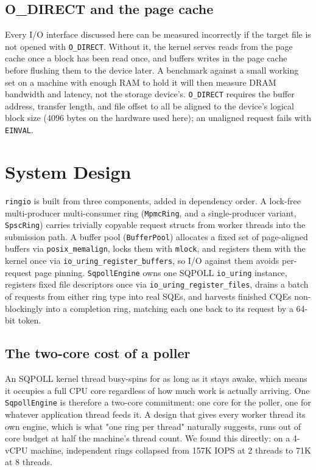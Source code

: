 \documentclass[conference]{IEEEtran}
\begin{document}
\subsection{O\_DIRECT and the page cache}

Every I/O interface discussed here can be measured incorrectly if the target file is not opened
with \texttt{O\_DIRECT}. Without it, the kernel serves reads from the page cache once a block has
been read once, and buffers writes in the page cache before flushing them to the device later.
A benchmark against a small working set on a machine with enough RAM to hold it will then measure
DRAM bandwidth and latency, not the storage device's. \texttt{O\_DIRECT} requires the buffer
address, transfer length, and file offset to all be aligned to the device's logical block size
(4096 bytes on the hardware used here); an unaligned request fails with \texttt{EINVAL}.

\section{System Design}

\texttt{ringio} is built from three components, added in dependency order. A lock-free
multi-producer multi-consumer ring (\texttt{MpmcRing}, and a single-producer variant,
\texttt{SpscRing}) carries trivially copyable request structs from worker threads into the
submission path. A buffer pool (\texttt{BufferPool}) allocates a fixed set of page-aligned
buffers via \texttt{posix\_memalign}, locks them with \texttt{mlock}, and registers them with
the kernel once via \texttt{io\_uring\_register\_buffers}, so I/O against them avoids
per-request page pinning. \texttt{SqpollEngine} owns one SQPOLL \texttt{io\_uring} instance,
registers fixed file descriptors once via \texttt{io\_uring\_register\_files}, drains a batch of
requests from either ring type into real SQEs, and harvests finished CQEs non-blockingly into a
completion ring, matching each one back to its request by a 64-bit token.

\subsection{The two-core cost of a poller}

An SQPOLL kernel thread busy-spins for as long as it stays awake, which means it occupies a full
CPU core regardless of how much work is actually arriving. One \texttt{SqpollEngine} is
therefore a two-core commitment: one core for the poller, one for whatever application thread
feeds it. A design that gives every worker thread its own engine, which is what "one ring per
thread" naturally suggests, runs out of core budget at half the machine's thread count. We found
this directly: on a 4-vCPU machine, independent rings collapsed from 157K IOPS at 2 threads to
71K at 8 threads.
\end{document}
